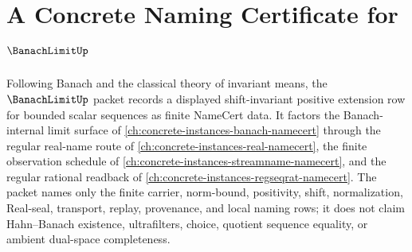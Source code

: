 \chapter{A Concrete Naming Certificate for $\BanachLimitUp$}
\label{ch:concrete-instances-banach-limit-namecert}

Following Banach and the classical theory of invariant means, the $\BanachLimitUp$ packet records a displayed shift-invariant positive extension row for bounded scalar sequences as finite NameCert data. It factors the Banach-internal limit surface of \autoref{ch:concrete-instances-banach-namecert} through the regular real-name route of \autoref{ch:concrete-instances-real-namecert}, the finite observation schedule of \autoref{ch:concrete-instances-streamname-namecert}, and the regular rational readback of \autoref{ch:concrete-instances-regseqrat-namecert}. The packet names only the finite carrier, norm-bound, positivity, shift, normalization, Real-seal, transport, replay, provenance, and local naming rows; it does not claim Hahn--Banach existence, ultrafilters, choice, quotient sequence equality, or ambient dual-space completeness.

